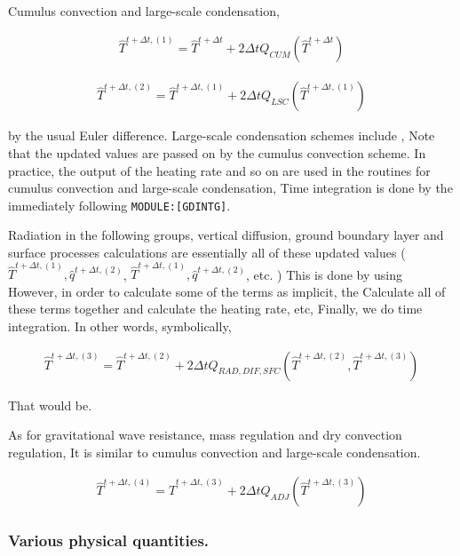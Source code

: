 Cumulus convection and large-scale condensation,

\begin{eqnarray}
  \hat{T}^{t+\Delta t,(1)} = \hat{T}^{t+\Delta t} 
                         +  2 \Delta t Q_{CUM}(\hat{T}^{t+\Delta t})
\end{eqnarray}

\begin{eqnarray}
  \hat{T}^{t+\Delta t,(2)} = \hat{T}^{t+\Delta t,(1)} 
                         +  2 \Delta t Q_{LSC}(\hat{T}^{t+\Delta t,(1)})
\end{eqnarray}

by the usual Euler difference. Large-scale condensation schemes include
, Note that the updated values are passed on by the cumulus convection
scheme. In practice, the output of the heating rate and so on are used
in the routines for cumulus convection and large-scale condensation,
Time integration is done by the immediately following
\texttt{MODULE:{[}GDINTG{]}}.

Radiation in the following groups, vertical diffusion, ground boundary
layer and surface processes calculations are essentially all of these
updated values ( \(\hat{T}^{t+\Delta t,(1)}, \hat{q}^{t+\Delta t,(2)}\),
\(\hat{T}^{t+\Delta t,(1)}, \hat{q}^{t+\Delta t,(2)}\), etc. ) This is
done by using However, in order to calculate some of the terms as
implicit, the Calculate all of these terms together and calculate the
heating rate, etc, Finally, we do time integration. In other words,
symbolically,

\begin{eqnarray}
  \hat{T}^{t+\Delta t,(3)} = \hat{T}^{t+\Delta t,(2)} 
              + 2 \Delta t Q_{RAD,DIF,SFC}
               (\hat{T}^{t+\Delta t,(2)},\hat{T}^{t+\Delta t,(3)})
\end{eqnarray}

That would be.

As for gravitational wave resistance, mass regulation and dry convection
regulation, It is similar to cumulus convection and large-scale
condensation.

\begin{eqnarray}
  \hat{T}^{t+\Delta t,(4)} = \hat{T}^{t+\Delta t,(3)} 
              +  2 \Delta t Q_{ADJ}(\hat{T}^{t+\Delta t,(3)})
\end{eqnarray}

\hypertarget{various-physical-quantities.}{%
\subsubsection{Various physical
quantities.}\label{various-physical-quantities.}}

